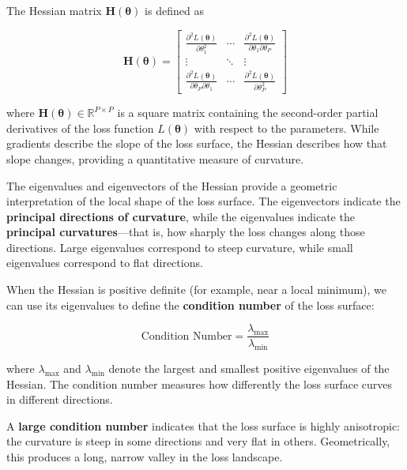 \documentclass{article}
\begin{document}
\noindent The Hessian matrix \( \mathbf{H}(\boldsymbol{\theta}) \) is defined as

\[
\mathbf{H}(\boldsymbol{\theta}) =
\begin{bmatrix}
\frac{\partial^2 L(\boldsymbol{\theta})}{\partial \theta_1^2} & \cdots & \frac{\partial^2 L(\boldsymbol{\theta})}{\partial \theta_1 \partial \theta_P} \\
\vdots & \ddots & \vdots \\
\frac{\partial^2 L(\boldsymbol{\theta})}{\partial \theta_P \partial \theta_1} & \cdots & \frac{\partial^2 L(\boldsymbol{\theta})}{\partial \theta_P^2}
\end{bmatrix}
\]

\noindent where \( \mathbf{H}(\boldsymbol{\theta}) \in \mathbb{R}^{P \times P} \) is a square matrix containing the second-order partial derivatives of the loss function \( L(\boldsymbol{\theta}) \) with respect to the parameters. While gradients describe the slope of the loss surface, the Hessian describes how that slope changes, providing a quantitative measure of curvature.

\medskip

The eigenvalues and eigenvectors of the Hessian provide a geometric interpretation of the local shape of the loss surface. The eigenvectors indicate the \textbf{principal directions of curvature}, while the eigenvalues indicate the \textbf{principal curvatures}—that is, how sharply the loss changes along those directions. Large eigenvalues correspond to steep curvature, while small eigenvalues correspond to flat directions.

\medskip

\noindent When the Hessian is positive definite (for example, near a local minimum), we can use its eigenvalues to define the \textbf{condition number} of the loss surface:

\[
\text{Condition Number} = \frac{\lambda_{\max}}{\lambda_{\min}}
\]

\noindent where \( \lambda_{\max} \) and \( \lambda_{\min} \) denote the largest and smallest positive eigenvalues of the Hessian. The condition number measures how differently the loss surface curves in different directions.

\medskip

A \textbf{large condition number} indicates that the loss surface is highly anisotropic: the curvature is steep in some directions and very flat in others. Geometrically, this produces a long, narrow valley in the loss landscape.
\end{document}
